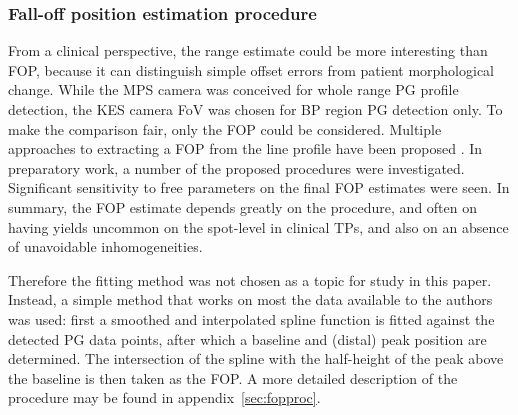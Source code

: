 \documentclass[a4paper,english]{article}
\begin{document}
\subsubsection{Fall-off position estimation procedure}

From a clinical perspective, the range estimate could be more interesting than FOP, because it can distinguish simple offset errors from patient morphological change. While the MPS camera was conceived for whole range PG profile detection, the KES camera FoV was chosen for BP region PG detection only. To make the comparison fair, only the FOP could be considered. Multiple approaches to extracting a FOP from the line profile have been proposed \citep{Smeets2012,Gueth2013,Roellinghoff2014a,Janssen2014,Sterpin2015}. In preparatory work, a number of the proposed procedures were investigated. Significant sensitivity to free parameters on the final FOP estimates were seen. In summary, the FOP estimate depends greatly on the procedure, and often on having yields uncommon on the spot-level in clinical TPs, and also on an absence of unavoidable inhomogeneities.

Therefore the fitting method was not chosen as a topic for study in this paper. Instead, a simple method that works on most the data available to the authors was used: first a smoothed and interpolated spline function is fitted against the detected PG data points, after which a baseline and (distal) peak position are determined. The intersection of the spline with the half-height of the peak above the baseline is then taken as the FOP. A more detailed description of the procedure may be found in appendix~\ref{sec:fopproc}.


\end{document}
